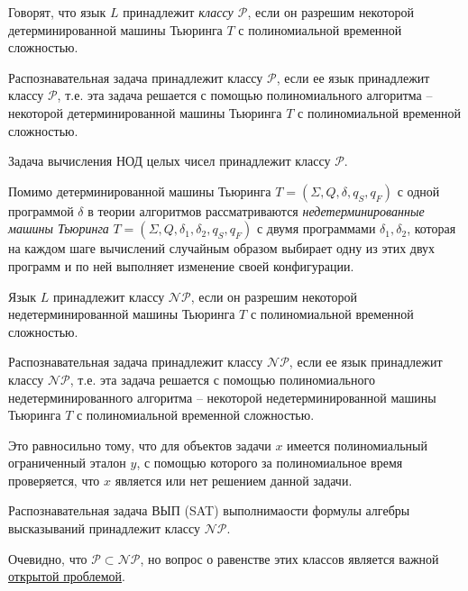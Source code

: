 \begin{definition}
    Говорят, что язык $L$ принадлежит \textit{классу $\mathscr{P}$}, если он разрешим некоторой детерминированной машины Тьюринга $T$ с полиномиальной временной сложностью.
\end{definition}

\begin{definition}
    Распознавательная задача принадлежит классу $\mathscr{P}$, если ее язык принадлежит классу $\mathscr{P}$, т.е. эта задача решается с помощью полиномиального алгоритма -- некоторой детерминированной машины Тьюринга $T$ с полиномиальной временной сложностью.
\end{definition}

\begin{example}
    Задача вычисления НОД целых чисел принадлежит классу $\mathscr{P}$.
\end{example}

Помимо детерминированной машины Тьюринга $T = (\Sigma, Q, \delta, q_S, q_F)$ с одной программой $\delta$ в теории алгоритмов рассматриваются \textit{недетерминированные машины Тьюринга} $T = (\Sigma, Q, \delta_1, \delta_2, q_S, q_F)$ с двумя программами $\delta_1,\delta_2$, которая на каждом шаге вычислений случайным образом выбирает одну из этих двух программ и по ней выполняет изменение своей конфигурации.

\begin{definition}
    Язык $L$ принадлежит классу $\mathscr{NP}$, если он разрешим некоторой недетерминированной машины Тьюринга $T$ с полиномиальной временной сложностью.
\end{definition}

\begin{definition}
    Распознавательная задача принадлежит классу $\mathscr{NP}$, если ее язык принадлежит классу $\mathscr{NP}$, т.е. эта задача решается с помощью полиномиального недетерминированного алгоритма -- некоторой недетерминированной машины Тьюринга $T$ с полиномиальной временной сложностью.
\end{definition}

Это равносильно тому, что для объектов задачи $x$ имеется полиномиальный ограниченный эталон $y$, с помощью которого за полиномиальное время проверяется, что $x$ является или нет решением данной задачи.

\begin{example}
    Распознавательная задача ВЫП (SAT) выполнимаости формулы алгебры высказываний принадлежит классу $\mathscr{NP}$.
\end{example}

Очевидно, что $\mathscr{P}\subset\mathscr{NP}$, но вопрос о равенстве этих классов является важной \underline{открытой проблемой}.